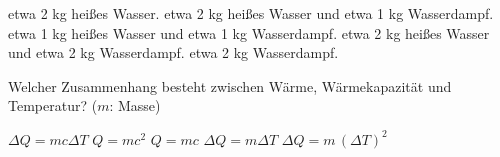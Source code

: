 \documentclass[11pt]{exam}
\begin{document}
\begin{questions}
\begin{choices}
	\choice etwa 2 kg heißes Wasser.
	\choice etwa 2 kg heißes Wasser und etwa 1 kg Wasserdampf.
	\choice etwa 1 kg heißes Wasser und etwa 1 kg Wasserdampf.
	\choice etwa 2 kg heißes Wasser und etwa 2 kg Wasserdampf.
	\choice etwa 2 kg Wasserdampf.
\end{choices}

\vspace{3mm}\question Welcher Zusammenhang besteht zwischen Wärme, Wärmekapazität und Temperatur? (\(m\): Masse)

\begin{choices}
	\choice \(\Delta Q = m c \Delta T\)
	\choice \(Q = m c^2\)
	\choice \(Q = m c\)
	\choice \(\Delta Q = m \Delta T\)
	\choice \(\Delta Q = m \, (\Delta T)^2\)
\end{choices}

\vspace{3mm}\end{questions}
\end{document}
